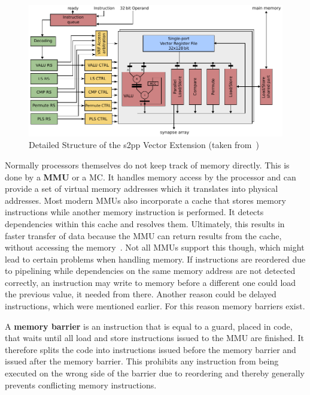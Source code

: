 {\begin{figure}[htbp]
    \centering
    \includegraphics[width=\textwidth]{pictures/s2pp.pdf}
    \caption{\label{fig:s2pp} Detailed Structure of the \ac{s2pp} Vector Extension (taken from~\citeauthor{PPU})}
\end{figure}

Normally processors themselves do not keep track of memory directly.
This is done by a \textbf{\ac{MMU}} or a \ac{MC}.
It handles memory access by the processor and can provide a set of virtual memory addresses which it translates into physical addresses.
Most modern \ac{MMU}s also incorporate a cache that stores memory instructions while another memory instruction is performed.
It detects dependencies within this cache and resolves them.
Ultimately, this results in faster transfer of data because the \ac{MMU} can return results from the cache, without accessing the memory~\cite[p.~435ff.]{microprocessor}.
Not all \ac{MMU}s support this though, which might lead to certain problems when handling memory.
If instructions are reordered due to pipelining while dependencies on the same memory address are not detected correctly, an instruction may write to memory before a different one could load the previous value, it needed from there.
Another reason could be delayed instructions, which were mentioned earlier.
For this reason memory barriers exist.

A \textbf{memory barrier} is an instruction that is equal to a guard, placed in code, that waits until all load and store instructions issued to the \ac{MMU} are finished.
It therefore splits the code into instructions issued before the memory barrier and issued after the memory barrier.
This prohibits any instruction from being executed on the wrong side of the barrier due to reordering and thereby generally prevents conflicting memory instructions.

}
